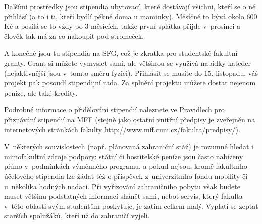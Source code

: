 Dalšími prostředky jsou stipendia ubytovací, které dostávají všichni, kteří se o ně přihlásí (a to i ti, kteří bydlí pěkně doma u maminky). Měsíčně to bývá okolo 600 Kč a posílá se to vždy po 3 měsících, takže první splátka přijde v~prosinci a člověk tak má za co nakoupit pod stromeček.


A konečně jsou tu stipendia na SFG, což je
zkratka pro studentské fakultní granty. Grant si můžete vymyslet
sami, ale většinou se využívá nabídky kateder (nejaktivnější jsou
v~tomto směru fyzici). Přihlásit se musíte do 15. listopadu, váš
projekt pak posoudí stipendijní rada. Za splnění projektu můžete
dostat nejenom peníze, ale také kredity.


Podrobné informace o přidělování stipendií naleznete ve Pravidlech
pro přiznávání stipendií na MFF (stejně jako ostatní vnitřní
předpisy je zveřejněn na internetových stránkách fakulty \url{http://www.mff.cuni.cz/fakulta/predpisy/}).

V~některých souvislostech (např. plánovaná zahraniční stáž) je
rozumné hledat i mimofakultní zdroje podpory: státní či
hostitelské peníze jsou často nabízeny přímo v~podmínkách
výměnného programu, a pokud nejsou, kromě fakultního účelového
stipendia lze žádat též o příspěvek z~univerzitního fondu mobility
či u~několika hodných nadací. Při vyřizování zahraničního pobytu
však budete muset většinu podstatných informací shánět sami, neboť
servis, který fakulta v~této oblasti svým studentům poskytuje, je
zatím celkem malý. Vyplatí se zeptat starších spolužáků, kteří už
do zahraničí vyjeli.

